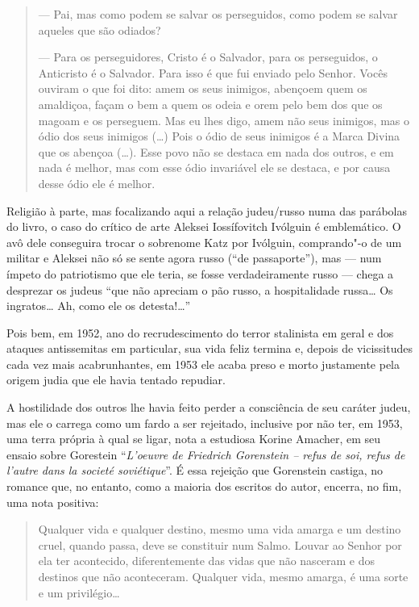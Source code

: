 \begin{quote}
--- Pai, mas como podem se salvar os perseguidos, como podem se salvar
aqueles que são odiados?

\noindent{}--- Para os perseguidores, Cristo é o Salvador, para os perseguidos, o
Anticristo é o Salvador. Para isso é que fui enviado pelo Senhor. Vocês
ouviram o que foi dito: amem os seus inimigos, abençoem quem os
amaldiçoa, façam o bem a quem os odeia e orem pelo bem dos que os magoam
e os perseguem. Mas eu lhes digo, amem não seus inimigos, mas o ódio dos
seus inimigos (\ldots{}) Pois o ódio de seus inimigos é a Marca Divina que os
abençoa (\ldots{}). Esse povo não se destaca em nada dos outros, e em nada é
melhor, mas com esse ódio invariável ele se destaca, e por causa desse
ódio ele é melhor.
\end{quote}

Religião à parte, mas focalizando aqui a relação judeu/russo numa das
parábolas do livro, o caso do crítico de arte Aleksei Iossífovitch
Ivólguin é emblemático. O avô dele conseguira trocar o sobrenome Katz por
Ivólguin, comprando"-o de um militar e Aleksei não só se sente agora
russo (``de passaporte''), mas --- num ímpeto do patriotismo que ele
teria, se fosse verdadeiramente russo --- chega a desprezar os judeus
``que não apreciam o pão russo, a hospitalidade russa\ldots{} Os ingratos\ldots{}
Ah, como ele os detesta!\ldots{}''

Pois bem, em 1952, ano do recrudescimento do terror stalinista em geral
e dos ataques antissemitas em particular, sua vida feliz termina e,
depois de vicissitudes cada vez mais acabrunhantes, em 1953 ele acaba
preso e morto justamente pela origem judia que ele havia tentado
repudiar.

A hostilidade dos outros lhe havia feito perder a consciência de seu
caráter judeu, mas ele o carrega como um fardo a ser rejeitado,
inclusive por não ter, em 1953, uma terra própria à qual se ligar, nota
a estudiosa Korine Amacher, em seu ensaio sobre Gorestein ``\emph{L'oeuvre de
Friedrich Gorenstein -- refus de soi, refus de l'autre dans la societé
soviétique}''. É essa rejeição que Gorenstein castiga, no romance que, no entanto, como a maioria dos escritos do autor, encerra,
no fim, uma nota positiva: 

\begin{quote}
Qualquer vida e qualquer destino, mesmo uma
vida amarga e um destino cruel, quando passa, deve se constituir num
Salmo. Louvar ao Senhor por ela ter acontecido, diferentemente das vidas
que não nasceram e dos destinos que não aconteceram. Qualquer vida,
mesmo amarga, é uma sorte e um privilégio\ldots{}
\end{quote}

